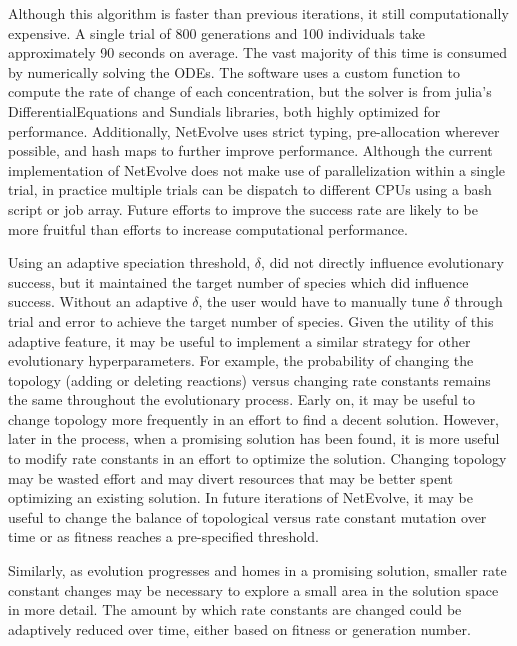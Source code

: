 \documentclass[12pt]{report}
\begin{document}
Although this algorithm is faster than previous iterations, it still computationally expensive. A single trial of 800 generations and 100 individuals take approximately 90 seconds on average. The vast majority of this time is consumed by numerically solving the ODEs. The software uses a custom function to compute the rate of change of each concentration, but the solver is from julia's DifferentialEquations and Sundials libraries, both highly optimized for performance. Additionally, NetEvolve uses strict typing, pre-allocation wherever possible, and hash maps to further improve performance. Although the current implementation of NetEvolve does not make use of parallelization within a single trial, in practice multiple trials can be dispatch to different CPUs using a bash script or job array. Future efforts to improve the success rate are likely to be more fruitful than efforts to increase computational performance.


Using an adaptive speciation threshold, $\delta$, did not directly influence evolutionary success, but it maintained the target number of species which did influence success. Without an adaptive $\delta$, the user would have to manually tune $\delta$ through trial and error to achieve the target number of species. Given the utility of this adaptive feature, it may be useful to implement a similar strategy for other evolutionary hyperparameters. For example, the probability of changing the topology (adding or deleting reactions) versus changing rate constants remains the same throughout the evolutionary process. Early on, it may be useful to change topology more frequently in an effort to find a decent solution. However, later in the process, when a promising solution has been found, it is more useful to modify rate constants in an effort to optimize the solution. Changing topology may be wasted effort and may divert resources that may be better spent optimizing an existing solution. In future iterations of NetEvolve, it may be useful to change the balance of topological versus rate constant mutation over time or as fitness reaches a pre-specified threshold.

Similarly, as evolution progresses and homes in a promising solution, smaller rate constant changes may be necessary to explore a small area in the solution space in more detail. The amount by which rate constants are changed could be adaptively reduced over time, either based on fitness or generation number. 
\end{document}
